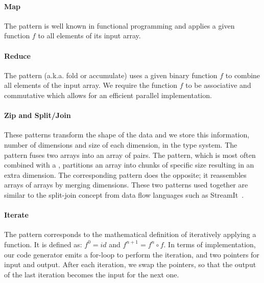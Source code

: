 
\paragraph{Map}
The  pattern is well known in functional programming and applies a given function $f$ to all elements of its input array.

\paragraph{Reduce}
The  pattern (a.k.a. fold or accumulate) uses a given binary function $f$ to combine all elements of the input array.
We require the function $f$ to be associative and commutative which allows for an efficient parallel implementation.

\paragraph{Zip and Split/Join}
These patterns transform the shape of the data and we store this information, \ie number of dimensions and size of each dimension, in the type system.
The  pattern fuses two arrays into an array of pairs.
The  pattern, which is most often combined with a , partitions an array into chunks of specific size resulting in an extra dimension.
The corresponding  pattern does the opposite; it reassembles arrays of arrays by merging dimensions.
These two patterns used together are similar to the split-join concept from data flow languages such as StreamIt~\cite{thies02streamit}.
 
\paragraph{Iterate}
The  pattern corresponds to the mathematical definition of iteratively applying a function.
It is defined as: {$f^0 = id$} and {$f^{n+1} = f^n \circ f$}.
In terms of implementation, our code generator emits a for-loop to perform the iteration, and two pointers for input and output.
After each iteration, we swap the pointers, so that the output of the last iteration becomes the input for the next one.


